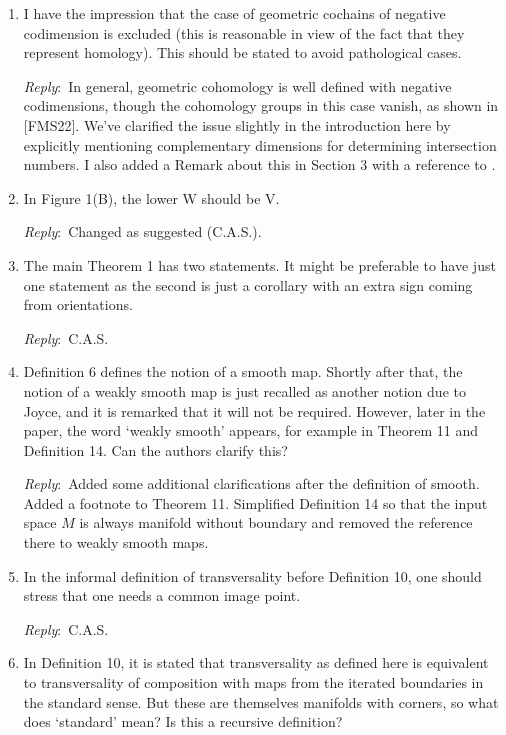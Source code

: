 \documentclass{amsart}
\newcommand{\ar}{\medskip\noindent\textit{Reply}:\ }
\newcommand{\cas}{\ar C.A.S.}
\begin{document}
\begin{enumerate}
	\item I have the impression that the case of geometric cochains of negative codimension is excluded (this is reasonable in view of the fact that they represent homology). This should be stated to avoid pathological cases.

	\ar In general, geometric cohomology is well defined with negative codimensions, though the cohomology groups in this case vanish, as shown in [FMS22]. We've clarified the issue slightly in the introduction here by explicitly mentioning complementary dimensions for determining intersection numbers. I also added a Remark about this in Section 3 with a reference to \cite{medina2022foundations}.

	\item In Figure 1(B), the lower W should be V.

	\ar Changed as suggested (C.A.S.).

	\item The main Theorem 1 has two statements. It might be preferable to have just one statement as the second is just a corollary with an extra sign coming from orientations.

	\cas

	\item Definition 6 defines the notion of a smooth map. Shortly after that, the notion of a weakly smooth map is just recalled as another notion due to Joyce, and it is remarked that it will not be required. However, later in the paper, the word `weakly smooth' appears, for example in Theorem 11 and Definition 14. Can the authors clarify this?

	\ar Added some additional clarifications after the definition of smooth. Added a footnote to Theorem 11. Simplified Definition 14 so that the input space $M$ is always manifold without boundary and removed the reference there to weakly smooth maps.

	\item In the informal definition of transversality before Definition 10, one should stress that one needs a common image point.

	\cas

	\item In Definition 10, it is stated that transversality as defined here is equivalent to transversality of composition with maps from the iterated boundaries in the standard sense. But these are themselves manifolds with corners, so what does `standard' mean? Is this a recursive definition?


\end{enumerate}
\end{document}
